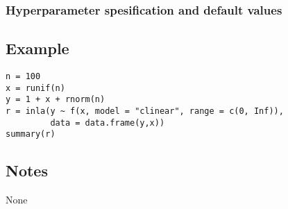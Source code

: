 \documentclass[a4paper,11pt]{article}
\begin{document}
\subsubsection*{Hyperparameter spesification and default values}


\subsection*{Example}

\begin{verbatim}
n = 100
x = runif(n)
y = 1 + x + rnorm(n)
r = inla(y ~ f(x, model = "clinear", range = c(0, Inf)),
         data = data.frame(y,x))
summary(r)
\end{verbatim}

\subsection*{Notes}
None
\end{document}
